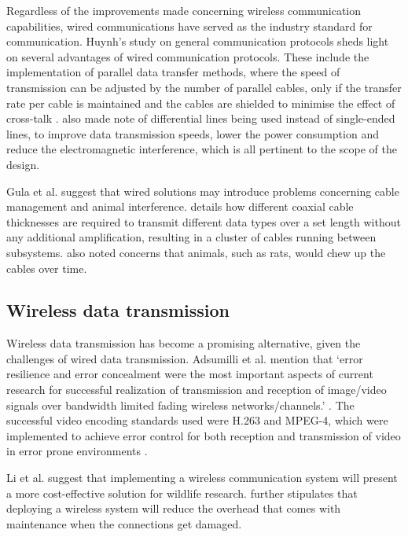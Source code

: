 \documentclass[class=report,11pt,crop=false]{standalone}
\begin{document}
Regardless of the improvements made concerning wireless communication capabilities, wired communications have served as the industry standard for communication. Huynh’s study on general communication protocols \cite{huynh2010study} sheds light on several advantages of wired communication protocols. These include the implementation of parallel data transfer methods, where the speed of transmission can be adjusted by the number of parallel cables, only if the transfer rate per cable is maintained and the cables are shielded to minimise the effect of cross-talk \cite{huynh2010study}. \cite{huynh2010study} also made note of differential lines being used instead of single-ended lines, to improve data transmission speeds, lower the power consumption and reduce the electromagnetic interference, which is all pertinent to the scope of the design.

Gula et al. \cite{gula2010audio} suggest that wired solutions may introduce problems concerning cable management and animal interference. \cite{gula2010audio} details how different coaxial cable thicknesses are required to transmit different data types over a set length without any additional amplification, resulting in a cluster of cables running between subsystems. \cite{gula2010audio} also noted concerns that animals, such as rats, would chew up the cables over time. 

\subsection{Wireless data transmission}

Wireless data transmission has become a promising alternative, given the challenges of wired data transmission. Adsumilli et al. mention that ‘error resilience and error concealment were the most important aspects of current research for successful realization of transmission and reception of image/video signals over bandwidth limited fading wireless networks/channels.’ \cite{adsumilli2002adaptive}. The successful video encoding standards used were H.263 and MPEG-4, which were implemented to achieve error control for both reception and transmission of video in error prone environments \cite{adsumilli2002adaptive}. 

Li et al. \cite{li2010design} suggest that implementing a wireless communication system will present a more cost-effective solution for wildlife research.  \cite{li2010design} further stipulates that deploying a wireless system will reduce the overhead that comes with maintenance when the connections get damaged.
\end{document}

